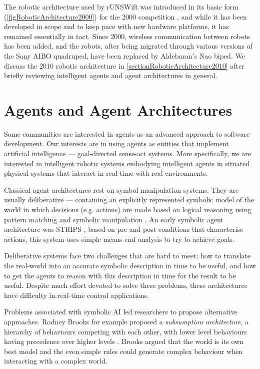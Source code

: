 \documentclass[pdftex,11pt,a4paper]{report}
\begin{document}
The robotic architecture used by rUNSWift was introduced in its basic form (\autoref{figRoboticArchitecture2000}) for the 2000 competition \cite{hengst00unswunited}, and while it has been developed in scope and to keep pace with new hardware platforms, it has remained essentially in tact.  Since 2000, wireless communication between robots has been added, and the robots, after being migrated through various versions of the Sony AIBO quadruped, have been replaced by Aldebaran's Nao biped. We discuss the 2010 robotic architecture in \autoref{sectionRoboticArchitecture2010} after briefly reviewing intelligent agents and agent architectures in general.  
 
\section{Agents and Agent Architectures}

Some communities are interested in agents as an advanced approach to software development. Our interests are in using agents as entities that implement artificial intelligence --- goal-directed sense-act systems. More specifically, we are interested in intelligent robotic systems embodying intelligent agents in situated physical systems that interact in real-time with real environments. 

Classical agent architectures rest on symbol manipulation systems. They are usually deliberative --- containing an explicitly represented symbolic model of the world in which decisions (e.g. actions) are made based on logical reasoning using pattern matching and symbolic manipulation \cite{Wooldridge95intelligentagents:}. An early symbolic agent architecture was STRIPS \cite{fikes71strips}, based on pre and post conditions that characterise actions, this system uses simple means-end analysis to try to achieve goals. 

Deliberative systems face two challenges that are hard to meet: how to translate the real-world  into an accurate symbolic description in time to be useful, and how to get the agents to reason with this description in time for the result to be useful. Despite much effort devoted to solve these problems, these architectures have difficulty in real-time control applications. 

Problems associated with symbolic AI led researchers to propose alternative approaches. Rodney Brooks for example proposed a \emph{subsumption architecture}, a hierarchy of behaviours competing with each other, with lower level behaviours having precedence over higher levels \cite{brooks86robot}. Brooks argued that the world is its own best model and the even simple rules could generate complex behaviour when interacting with a complex world.   
\end{document}
